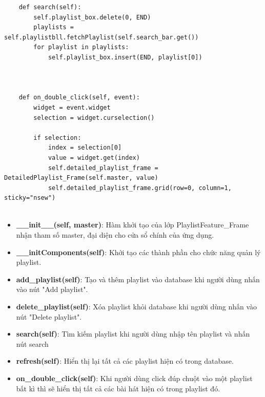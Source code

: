 \documentclass[a4paper]{article}
\begin{document}
\begin{mdframed}[hidealllines=true,backgroundcolor=magenta!10]
\begin{lstlisting}
    def search(self):
        self.playlist_box.delete(0, END)
        playlists = self.playlistbll.fetchPlaylist(self.search_bar.get())
        for playlist in playlists:
            self.playlist_box.insert(END, playlist[0])



    def on_double_click(self, event):
        widget = event.widget
        selection = widget.curselection()

        if selection:
            index = selection[0]
            value = widget.get(index)
            self.detailed_playlist_frame = DetailedPlaylist_Frame(self.master, value)
            self.detailed_playlist_frame.grid(row=0, column=1, sticky="nsew")


\end{lstlisting}
\end{mdframed}


\begin{itemize}
    \item \textbf{\_\_init\_\_(self, master)}: Hàm khởi tạo của lớp PlaylistFeature\_Frame nhận tham số master, đại diện cho cửa sổ chính của ứng dụng. 
    \item \textbf{\_\_initComponents(self)}: Khởi tạo các thành phần cho chức năng quản lý playlist.
    \item \textbf{add\_playlist(self)}: Tạo và thêm playlist vào database khi người dùng nhấn vào nút "Add playlist".
    \item \textbf{delete\_playlist(self)}: Xóa playlist khỏi database khi người dùng nhấn vào nút "Delete playlist".
    \item \textbf{search(self)}: Tìm kiếm playlist khi người dùng nhập tên playlist và nhấn nút search
    \item \textbf{refresh(self)}: Hiển thị lại tất cả các playlist hiện có trong database.
    \item \textbf{on\_double\_click(self)}: Khi người dùng click đúp chuột vào một playlist bất kì thì sẽ hiển thị tất cả các bài hát hiện có trong playlist đó.
\end{itemize}
\end{document}
